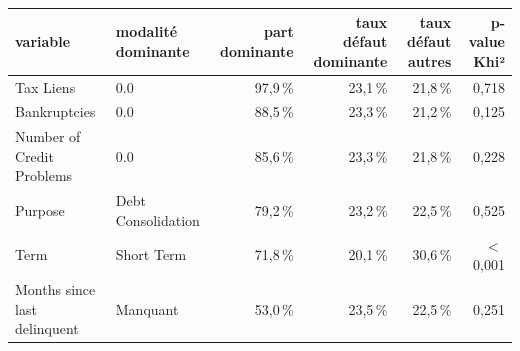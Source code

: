 \begin{tabular}{llrrrr}
\toprule
\textbf{variable} & \textbf{modalité dominante} & \textbf{part dominante} & \textbf{taux défaut dominante} & \textbf{taux défaut autres} & \textbf{p-value Khi²} \\
\midrule
Tax Liens & 0.0 & 97,9\,\% & 23,1\,\% & 21,8\,\% & 0,718 \\
Bankruptcies & 0.0 & 88,5\,\% & 23,3\,\% & 21,2\,\% & 0,125 \\
Number of Credit Problems & 0.0 & 85,6\,\% & 23,3\,\% & 21,8\,\% & 0,228 \\
Purpose & Debt Consolidation & 79,2\,\% & 23,2\,\% & 22,5\,\% & 0,525 \\
Term & Short Term & 71,8\,\% & 20,1\,\% & 30,6\,\% & $<$\,0,001 \\
Months since last delinquent & Manquant & 53,0\,\% & 23,5\,\% & 22,5\,\% & 0,251 \\
\bottomrule
\end{tabular}
